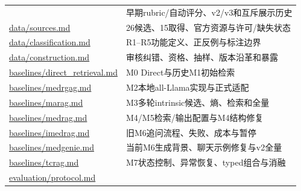 \documentclass[
  11pt,
  a4paper,
]{article}
\begin{document}
{\begin{longtable}[]{@{}
  >{\raggedright\arraybackslash}p{}
  >{\raggedright\arraybackslash}p{}@{}}
& 早期rubric/自动评分、v2/v3和互斥展示历史 \\
\href{https://github.com/xiotakut/cf_mrg/blob/main/papers/2026-10-02_cf_moa/author_dossier/records/data/sources.md}{data/\allowbreak{}sources.\allowbreak{}md}
& 26候选、15取得、官方资源与许可/缺失状态 \\
\href{https://github.com/xiotakut/cf_mrg/blob/main/papers/2026-10-02_cf_moa/author_dossier/records/data/classification.md}{data/\allowbreak{}classification.\allowbreak{}md}
& R1--R5功能定义、正反例与标注边界 \\
\href{https://github.com/xiotakut/cf_mrg/blob/main/papers/2026-10-02_cf_moa/author_dossier/records/data/construction.md}{data/\allowbreak{}construction.\allowbreak{}md}
& 审核纠错、资格、抽样、版本沿革和暴露 \\
\href{https://github.com/xiotakut/cf_mrg/blob/main/papers/2026-10-02_cf_moa/author_dossier/records/baselines/direct_retrieval.md}{baselines/\allowbreak{}direct\_\allowbreak{}retrieval.\allowbreak{}md}
& M0 Direct与历史M1初始检索 \\
\href{https://github.com/xiotakut/cf_mrg/blob/main/papers/2026-10-02_cf_moa/author_dossier/records/baselines/medrgag.md}{baselines/\allowbreak{}medrgag.\allowbreak{}md}
& M2本地all-Llama实现与正式适配 \\
\href{https://github.com/xiotakut/cf_mrg/blob/main/papers/2026-10-02_cf_moa/author_dossier/records/baselines/marag.md}{baselines/\allowbreak{}marag.\allowbreak{}md}
& M3多轮intrinsic候选、熵、检索和全量 \\
\href{https://github.com/xiotakut/cf_mrg/blob/main/papers/2026-10-02_cf_moa/author_dossier/records/baselines/medrag.md}{baselines/\allowbreak{}medrag.\allowbreak{}md}
& M4/M5检索/输出配置与M4结构修复 \\
\href{https://github.com/xiotakut/cf_mrg/blob/main/papers/2026-10-02_cf_moa/author_dossier/records/baselines/imedrag.md}{baselines/\allowbreak{}imedrag.\allowbreak{}md}
& 旧M6追问流程、失败、成本与暂停 \\
\href{https://github.com/xiotakut/cf_mrg/blob/main/papers/2026-10-02_cf_moa/author_dossier/records/baselines/medgenie.md}{baselines/\allowbreak{}medgenie.\allowbreak{}md}
& 当前M6生成背景、聊天示例修复与v2全量 \\
\href{https://github.com/xiotakut/cf_mrg/blob/main/papers/2026-10-02_cf_moa/author_dossier/records/baselines/tcrag.md}{baselines/\allowbreak{}tcrag.\allowbreak{}md}
& M7状态控制、异常恢复、typed组合与消融 \\
\href{https://github.com/xiotakut/cf_mrg/blob/main/papers/2026-10-02_cf_moa/author_dossier/records/evaluation/protocol.md}{evaluation/\allowbreak{}protocol.\allowbreak{}md}

\end{longtable}}
\end{document}
